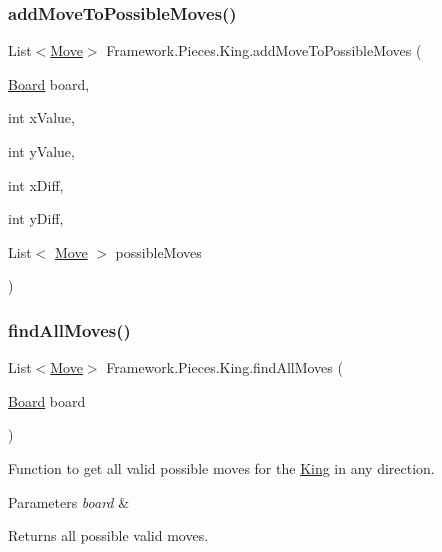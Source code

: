 \subsubsection{\texorpdfstring{add\+Move\+To\+Possible\+Moves()}{addMoveToPossibleMoves()}}
{\footnotesize\ttfamily List$<$\hyperlink{class_framework_1_1_move}{Move}$>$ Framework.\+Pieces.\+King.\+add\+Move\+To\+Possible\+Moves (\begin{DoxyParamCaption}\item[{\hyperlink{class_framework_1_1_board}{Board}}]{board,  }\item[{int}]{x\+Value,  }\item[{int}]{y\+Value,  }\item[{int}]{x\+Diff,  }\item[{int}]{y\+Diff,  }\item[{List$<$ \hyperlink{class_framework_1_1_move}{Move} $>$}]{possible\+Moves }\end{DoxyParamCaption})}

\hypertarget{class_framework_1_1_pieces_1_1_king_ab82bc839741d9c8531f8a9ca500e242b}{}\label{class_framework_1_1_pieces_1_1_king_ab82bc839741d9c8531f8a9ca500e242b} 
\subsubsection{\texorpdfstring{find\+All\+Moves()}{findAllMoves()}}
{\footnotesize\ttfamily List$<$\hyperlink{class_framework_1_1_move}{Move}$>$ Framework.\+Pieces.\+King.\+find\+All\+Moves (\begin{DoxyParamCaption}\item[{\hyperlink{class_framework_1_1_board}{Board}}]{board }\end{DoxyParamCaption})}

Function to get all valid possible moves for the \hyperlink{class_framework_1_1_pieces_1_1_king}{King} in any direction. 
\begin{DoxyParams}{Parameters}
{\em board} & \\
\hline
\end{DoxyParams}
\begin{DoxyReturn}{Returns}
all possible valid moves. 
\end{DoxyReturn}
\hypertarget{class_framework_1_1_pieces_1_1_king_a7df52797002424eea43d7c8a657daa5d}{}\label{class_framework_1_1_pieces_1_1_king_a7df52797002424eea43d7c8a657daa5d} 
